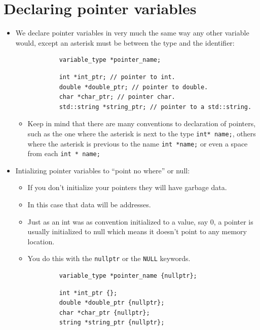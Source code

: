 \section{Declaring pointer variables}
\begin{itemize}
    \item We declare pointer variables in very much the same way any other variable would, except an asterisk must be between the type and the identifier:
        \begin{verbatim}
            variable_type *pointer_name;
        \end{verbatim}
        \begin{verbatim}
            int *int_ptr; // pointer to int.
            double *double_ptr; // pointer to double.
            char *char_ptr; // pointer char.
            std::string *string_ptr; // pointer to a std::string.
        \end{verbatim}
        \begin{itemize}
            \item Keep in mind that there are many conventions to declaration of pointers, such as the one where the asterisk is next to the type \texttt{int* name;}, others where the asterisk is previous to the name \texttt{int *name;} or even a space from each \texttt{int * name;}
        \end{itemize}
    
    \item Intializing pointer variables to ``point no where'' or null:
        \begin{itemize}
            \item If you don't initialize your pointers they will have garbage data.
            \item In this case that data will be addresses.
            \item Just as an int was as convention initialized to a value, say 0, a pointer is usually initialized to null which means it doesn't point to any memory location. 
            \item You do this with the \texttt{nullptr} or the \texttt{NULL} keywords.
        \end{itemize}
        \begin{verbatim}
            variable_type *pointer_name {nullptr};
        \end{verbatim}
        \begin{verbatim}
            int *int_ptr {};
            double *double_ptr {nullptr};
            char *char_ptr {nullptr};
            string *string_ptr {nullptr};
        \end{verbatim}
    

\end{itemize}
